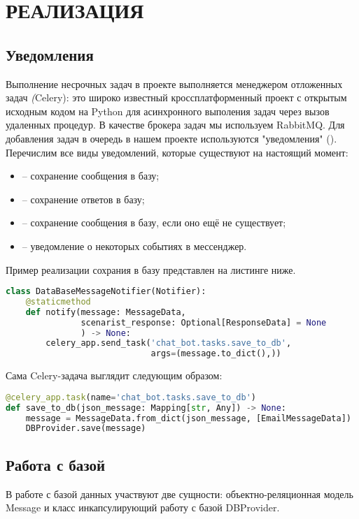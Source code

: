 \section{РЕАЛИЗАЦИЯ}
    \subsection{Уведомления}
    Выполнение несрочных задач в проекте выполняется менеджером отложенных задач \textit(Celery):
    это широко известный кроссплатформенный проект с открытым исходным кодом на Python для
    асинхронного выполения задач через вызов удаленных процедур. В качестве брокера задач мы используем RabbitMQ.
    Для добавления задач в очередь в нашем проекте используются "уведомления" ().
    Перечислим все виды уведомлений, которые существуют на настоящий момент:
    \begin{itemize}
        \item {} -- сохранение сообщения в базу;
        \item {} -- сохранение ответов в базу;
        \item {} -- сохранение сообщения в базу, если оно ещё не существует;
        \item {} -- уведомление о некоторых событиях в мессенджер.
    \end{itemize}
    Пример реализации сохрания в базу представлен на листинге ниже.
\begin{lstlisting}[language=Python]
class DataBaseMessageNotifier(Notifier):
    @staticmethod
    def notify(message: MessageData,
               scenarist_response: Optional[ResponseData] = None
               ) -> None:
        celery_app.send_task('chat_bot.tasks.save_to_db',
                             args=(message.to_dict(),))
\end{lstlisting}

    Сама Celery-задача выглядит следующим образом:
\begin{lstlisting}[language=Python]
@celery_app.task(name='chat_bot.tasks.save_to_db')
def save_to_db(json_message: Mapping[str, Any]) -> None:
    message = MessageData.from_dict(json_message, [EmailMessageData])
    DBProvider.save(message)
\end{lstlisting}

    \subsection{Работа с базой}
    В работе с базой данных участвуют две сущности: объектно-реляционная модель Message
    и класс инкапсулирующий работу с базой DBProvider.

